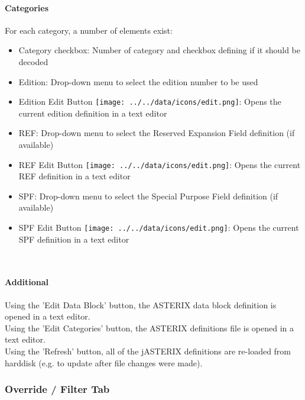 \paragraph{Categories}

For each category, a number of elements exist:

\begin{itemize}
\item Category checkbox: Number of category and checkbox defining if it should be decoded
\item Edition: Drop-down menu to select the edition number to be used
\item Edition Edit Button \texttt{[image: ../../data/icons/edit.png]}: Opens the current edition definition in a text editor
\item REF: Drop-down menu to select the Reserved Expansion Field definition (if available)
\item REF Edit Button \texttt{[image: ../../data/icons/edit.png]}: Opens the current REF definition in a text editor
\item SPF: Drop-down menu to select the Special Purpose Field definition (if available)
\item SPF Edit Button \texttt{[image: ../../data/icons/edit.png]}: Opens the current SPF definition in a text editor
\end{itemize}
\ \\

\paragraph{Additional}

Using the 'Edit Data Block' button, the ASTERIX data block definition is opened in a text editor. \\

Using the 'Edit Categories' button, the ASTERIX definitions file is opened in a text editor. \\

Using the 'Refresh' button, all of the jASTERIX definitions are re-loaded from harddisk (e.g. to update after file changes were made). \\

\subsubsection{Override / Filter Tab}
\label{sec:task_import_asterix_override}


